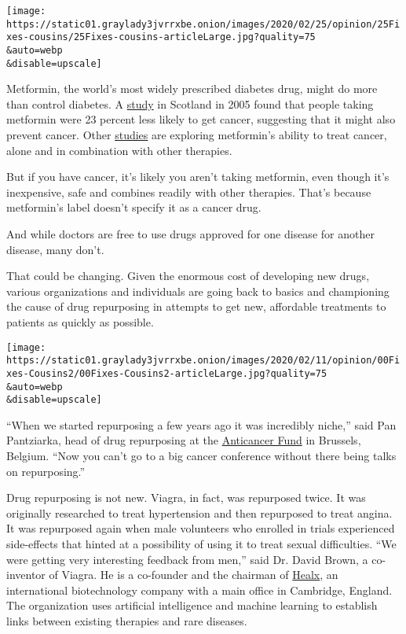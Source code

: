 \texttt{[image: https://static01.graylady3jvrrxbe.onion/images/2020/02/25/opinion/25Fixes-cousins/25Fixes-cousins-articleLarge.jpg?quality=75\\\&auto=webp\\\&disable=upscale]}

Metformin, the world's most widely prescribed diabetes drug, might do
more than control diabetes. A
\href{https://www.ncbi.nlm.nih.gov/pmc/articles/PMC558205/?report=reader}{study}
in Scotland in 2005 found that people taking metformin were 23 percent
less likely to get cancer, suggesting that it might also prevent cancer.
Other
\href{https://www.cancer.gov/about-cancer/treatment/clinical-trials/intervention/metformin-hydrochloride}{studies}
are exploring metformin's ability to treat cancer, alone and in
combination with other therapies.

But if you have cancer, it's likely you aren't taking metformin, even
though it's inexpensive, safe and combines readily with other therapies.
That's because metformin's label doesn't specify it as a cancer drug.

And while doctors are free to use drugs approved for one disease for
another disease, many don't.

That could be changing. Given the enormous cost of developing new drugs,
various organizations and individuals are going back to basics and
championing the cause of drug repurposing in attempts to get new,
affordable treatments to patients as quickly as possible.

\texttt{[image: https://static01.graylady3jvrrxbe.onion/images/2020/02/11/opinion/00Fixes-Cousins2/00Fixes-Cousins2-articleLarge.jpg?quality=75\\\&auto=webp\\\&disable=upscale]}

``When we started repurposing a few years ago it was incredibly niche,''
said Pan Pantziarka, head of drug repurposing at the
\href{https://www.anticancerfund.org/}{Anticancer Fund} in Brussels,
Belgium. ``Now you can't go to a big cancer conference without there
being talks on repurposing.''

Drug repurposing is not new. Viagra, in fact, was repurposed twice. It
was originally researched to treat hypertension and then repurposed to
treat angina. It was repurposed again when male volunteers who enrolled
in trials experienced side-effects that hinted at a possibility of using
it to treat sexual difficulties. ``We were getting very interesting
feedback from men,'' said Dr. David Brown, a co-inventor of Viagra. He
is a co-founder and the chairman of \href{https://healx.io/}{Healx}, an
international biotechnology company with a main office in Cambridge,
England. The organization uses artificial intelligence and machine
learning to establish links between existing therapies and rare
diseases.

